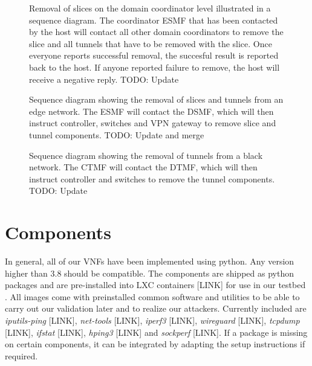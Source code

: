 \begin{figure}[hp]
  \centering
  
  \caption[Removal of slices on the domain coordinator level illustrated in a sequence diagram.]{Removal of slices on the domain coordinator level illustrated in a sequence diagram. The coordinator ESMF that has been contacted by the host will contact all other domain coordinators to remove the slice and all tunnels that have to be removed with the slice. Once everyone reports successful removal, the succesful result is reported back to the host. If anyone reported failure to remove, the host will receive a negative reply. TODO: Update}
  \label{fig:slice_removal_synchronization}
\end{figure}
\begin{figure}[hp]
  \centering
  
  \caption[Sequence diagram showing the removal of slices and tunnels from an edge network.]{Sequence diagram showing the removal of slices and tunnels from an edge network. The ESMF will contact the DSMF, which will then instruct controller, switches and VPN gateway to remove slice and tunnel components. TODO: Update and merge}
  \label{fig:slice_removal_edge}
\end{figure}
\begin{figure}[hp]
  \centering
  
  \caption[Sequence diagram showing the removal of tunnels from a black network.]{Sequence diagram showing the removal of tunnels from a black network. The CTMF will contact the DTMF, which will then instruct controller and switches to remove the tunnel components. TODO: Update}
  \label{fig:slice_removal_bn}
\end{figure}


\section{Components}
In general, all of our VNFs have been implemented using python. Any version higher than 3.8 should be compatible. The components are shipped as python packages and are pre-installed into LXC containers [LINK] for use in our testbed \cite{owntb}. All images come with preinstalled common software and utilities to be able to carry out our validation later and to realize our attackers. Currently included are \textit{iputils-ping} [LINK], \textit{net-tools} [LINK], \textit{iperf3} [LINK], \textit{wireguard} [LINK], \textit{tcpdump} [LINK], \textit{ifstat} [LINK], \textit{hping3} [LINK] and \textit{sockperf} [LINK]. If a package is missing on certain components, it can be integrated by adapting the setup instructions if required.


